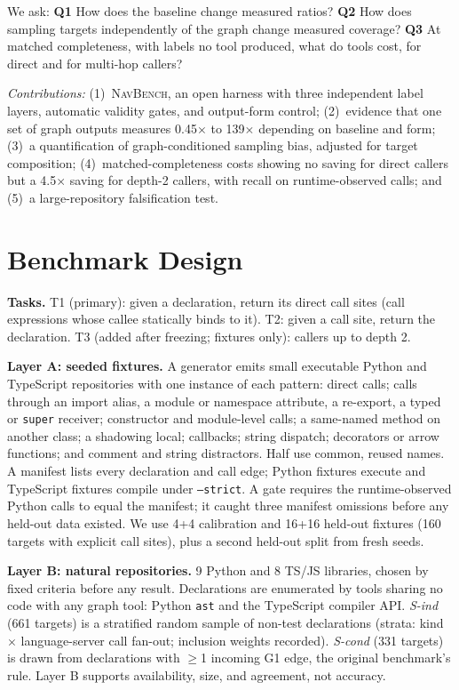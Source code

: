 \documentclass[conference]{IEEEtran}
\begin{document}
We ask:
\textbf{Q1} How does the baseline change measured ratios?
\textbf{Q2} How does sampling targets independently of the graph change measured coverage?
\textbf{Q3} At matched completeness, with labels no tool produced, what do tools cost, for direct and for multi-hop callers?

\emph{Contributions:}
(1)~\textsc{NavBench}, an open harness with three independent label layers, automatic validity gates, and output-form control;
(2)~evidence that one set of graph outputs measures 0.45$\times$ to 139$\times$ depending on baseline and form;
(3)~a quantification of graph-conditioned sampling bias, adjusted for target composition;
(4)~matched-completeness costs showing no saving for direct callers but a 4.5$\times$ saving for depth-2 callers, with recall on runtime-observed calls; and (5)~a large-repository falsification test.

\section{Benchmark Design}
\textbf{Tasks.}
T1 (primary): given a declaration, return its direct call sites (call expressions whose callee statically binds to it).
T2: given a call site, return the declaration.
T3 (added after freezing; fixtures only): callers up to depth 2.

\textbf{Layer A: seeded fixtures.}
A generator emits small executable Python and TypeScript repositories with one instance of each pattern:
direct calls; calls through an import alias, a module or namespace attribute, a re-export, a typed or \texttt{super} receiver; constructor and module-level calls; a same-named method on another class; a shadowing local; callbacks; string dispatch; decorators or arrow functions; and comment and string distractors.
Half use common, reused names.
A manifest lists every declaration and call edge; Python fixtures execute and TypeScript fixtures compile under \texttt{--strict}.
A gate requires the runtime-observed Python calls to equal the manifest; it caught three manifest omissions before any held-out data existed.
We use 4+4 calibration and 16+16 held-out fixtures (160 targets with explicit call sites), plus a second held-out split from fresh seeds.

\textbf{Layer B: natural repositories.}
9 Python and 8 TS/JS libraries, chosen by fixed criteria before any result.
Declarations are enumerated by tools sharing no code with any graph tool: Python \texttt{ast} and the TypeScript compiler API.
\emph{S-ind} (661 targets) is a stratified random sample of non-test declarations (strata: kind $\times$ language-server call fan-out; inclusion weights recorded).
\emph{S-cond} (331 targets) is drawn from declarations with $\ge$1 incoming G1 edge, the original benchmark's rule.
Layer B supports availability, size, and agreement, not accuracy.
\end{document}
